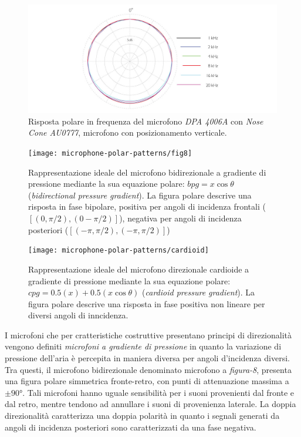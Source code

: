 \begin{refsection}
\begin{figure}[h]
\centering
\includegraphics[width=0.99\columnwidth]{CAPITOLI/0300/IMG/4006A-ddicate-4006A-Omni-Microphone-polar-pattern-nose-cone-veritical.jpg}
\caption[]{Risposta polare in frequenza del microfono \emph{DPA 4006A} con \emph{Nose Cone AU0777}, microfono con posizionamento verticale.}%
\label{pol:dpa4006nose}
\end{figure}

\begin{figure}[t]
\centering
\texttt{[image: microphone-polar-patterns/fig8]}
\caption[]{Rappresentazione ideale del microfono bidirezionale a gradiente di
pressione mediante la sua equazione polare: $bpg = x\cos\theta$
(\emph{bidirectional pressure gradient}). La figura polare descrive una risposta
in fase bipolare, positiva per angoli di incidenza frontali ($[(0,\pi/2),(0-\pi/2)]$),
negativa per angoli di incidenza posteriori ($[(-\pi,\pi/2),(-\pi,\pi/2)]$)}
\label{polar:fig8}
\end{figure}

\begin{figure}[t]
\centering
\texttt{[image: microphone-polar-patterns/cardioid]}
\caption[]{Rappresentazione ideale del microfono direzionale cardioide a gradiente
di pressione mediante la sua equazione polare: $cpg = 0.5(x) + 0.5(x\cos\theta)$
(\emph{cardioid pressure gradient}). La figura polare descrive una risposta in
fase positiva non lineare per diversi angoli di inncidenza.}
\label{polar:cardioid}
\end{figure}

I microfoni che per cratteristiche costruttive presentano principi di direzionalità
vengono definiti \emph{microfoni a gradiente di pressione} in quanto la variazione
di pressione dell'aria è percepita in maniera diversa per angoli d'incidenza diversi.
Tra questi, il microfono bidirezionale denominato microfono a \emph{figura-8},
presenta una figura polare simmetrica fronte-retro, con punti di attenuazione
massima a $\pm90°$. Tali microfoni hanno uguale sensibilità per i suoni
provenienti dal fronte e dal retro, mentre tendono ad annullare i suoni di
provenienza laterale. La doppia direzionalità caratterizza una doppia polarità
in quanto i segnali generati da angoli di incidenza posteriori sono caratterizzati da
una fase negativa.


\end{refsection}
